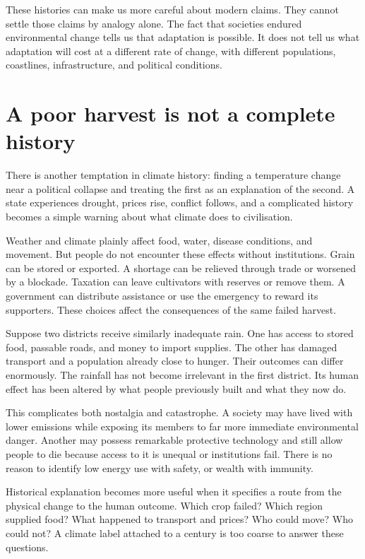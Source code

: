 \documentclass[12pt,a4paper]{book}
\begin{document}
These histories can make us more careful about modern claims. They cannot settle those claims by analogy alone. The fact that societies endured environmental change tells us that adaptation is possible. It does not tell us what adaptation will cost at a different rate of change, with different populations, coastlines, infrastructure, and political conditions.

\section*{A poor harvest is not a complete history}

There is another temptation in climate history: finding a temperature change near a political collapse and treating the first as an explanation of the second. A state experiences drought, prices rise, conflict follows, and a complicated history becomes a simple warning about what climate does to civilisation.

Weather and climate plainly affect food, water, disease conditions, and movement. But people do not encounter these effects without institutions. Grain can be stored or exported. A shortage can be relieved through trade or worsened by a blockade. Taxation can leave cultivators with reserves or remove them. A government can distribute assistance or use the emergency to reward its supporters. These choices affect the consequences of the same failed harvest.

Suppose two districts receive similarly inadequate rain. One has access to stored food, passable roads, and money to import supplies. The other has damaged transport and a population already close to hunger. Their outcomes can differ enormously. The rainfall has not become irrelevant in the first district. Its human effect has been altered by what people previously built and what they now do.

This complicates both nostalgia and catastrophe. A society may have lived with lower emissions while exposing its members to far more immediate environmental danger. Another may possess remarkable protective technology and still allow people to die because access to it is unequal or institutions fail. There is no reason to identify low energy use with safety, or wealth with immunity.

Historical explanation becomes more useful when it specifies a route from the physical change to the human outcome. Which crop failed? Which region supplied food? What happened to transport and prices? Who could move? Who could not? A climate label attached to a century is too coarse to answer these questions.
\end{document}
